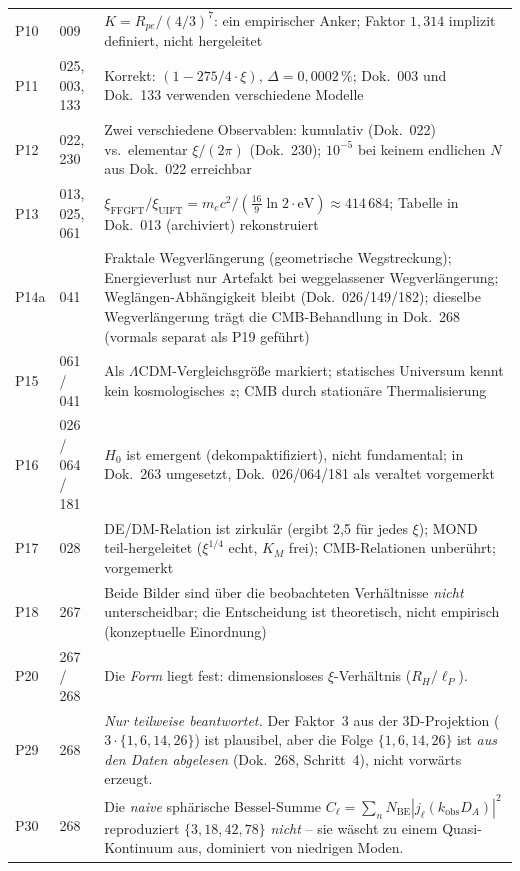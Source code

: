 \begin{longtable}{@{}p{0.9cm}p{3.1cm}p{10.2cm}@{}}
P10 & 009 & $K = R_{pe}/(4/3)^7$: ein empirischer Anker; \newline Faktor $1{,}314$ implizit definiert, nicht hergeleitet \\
P11 & 025, 003, 133 & Korrekt: $(1-275/4\cdot\xi)$, $\Delta=0{,}0002\,\%$; \newline Dok.~003 und Dok.~133 verwenden verschiedene Modelle \\
P12 & 022, 230 & Zwei verschiedene Observablen: kumulativ (Dok.~022) vs.\ elementar $\xi/(2\pi)$ (Dok.~230); $10^{-5}$ bei keinem endlichen $N$ aus Dok.~022 erreichbar \\
P13 & 013, 025, 061 & $\xi_\text{FFGFT}/\xi_\text{UIFT} = m_ec^2/(\frac{16}{9}\ln 2\cdot\text{eV}) \approx 414\,684$; \newline Tabelle in Dok.~013 (archiviert) rekonstruiert \\
P14a & 041 & Fraktale Wegverlängerung (geometrische Wegstreckung); Energieverlust nur Artefakt bei weggelassener Wegverlängerung; Weglängen-Abhängigkeit bleibt (Dok.~026/149/182); dieselbe Wegverlängerung trägt die CMB-Behandlung in Dok.~268 (vormals separat als P19 geführt) \\
P15 & 061 / 041 & Als $\Lambda$CDM-Vergleichsgröße markiert; statisches Universum kennt kein kosmologisches $z$; CMB durch stationäre Thermalisierung \\
P16 & 026 / 064 / 181 & $H_0$ ist emergent (dekompaktifiziert), nicht fundamental; in Dok.~263 umgesetzt, Dok.~026/064/181 als veraltet vorgemerkt \\
P17 & 028 & DE/DM-Relation ist zirkulär (ergibt 2,5 für jedes $\xi$); MOND teil-hergeleitet ($\xi^{1/4}$ echt, $K_M$ frei); CMB-Relationen unberührt; vorgemerkt \\
P18 & 267 & Beide Bilder sind über die beobachteten Verhältnisse \emph{nicht} unterscheidbar; die Entscheidung ist theoretisch, nicht empirisch (konzeptuelle Einordnung) \\
P20 & 267 / 268 & Die \emph{Form} liegt fest: dimensionsloses $\xi$-Verhältnis ($R_H/\ell_P$). \\
P29 & 268 & \emph{Nur teilweise beantwortet.} Der Faktor~3 aus der 3D-Projektion ($3\cdot\{1,6,14,26\}$) ist plausibel, aber die Folge $\{1,6,14,26\}$ ist \emph{aus den Daten abgelesen} (Dok.~268, Schritt~4), nicht vorwärts erzeugt. \\
P30 & 268 & Die \emph{naive} sphärische Bessel-Summe $C_\ell=\sum_n N_\mathrm{BE}|j_\ell(k_\mathrm{obs}D_A)|^2$ reproduziert $\{3,18,42,78\}$ \emph{nicht} -- sie wäscht zu einem Quasi-Kontinuum aus, dominiert von niedrigen Moden. \\

\end{longtable}
